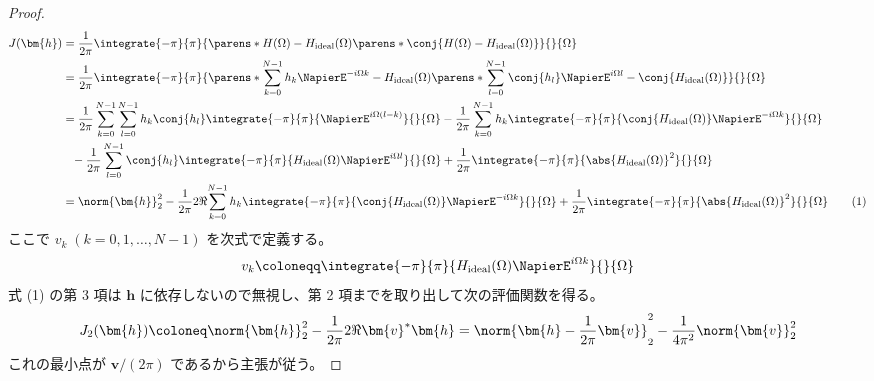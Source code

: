         \begin{proof}
            \begin{align*}
                J(\bm{h}) &= \frac{1}{2\pi}\integrate{-\pi}{\pi}{\parens*{H(\Omega)-\Hideal(\Omega)}\parens*{\conj{H(\Omega)-\Hideal(\Omega)}}}{}{\Omega} \\
                &= \frac{1}{2\pi}\integrate{-\pi}{\pi}{\parens*{\sum_{k=0}^{N-1} h_k\NapierE^{-i\Omega k} -\Hideal(\Omega)}\parens*{\sum_{l=0}^{N-1} \conj{h_l}\NapierE^{i\Omega l} -\conj{\Hideal(\Omega)}}}{}{\Omega} \\
                &= \frac{1}{2\pi}\sum_{k=0}^{N-1}\sum_{l=0}^{N-1} h_k\conj{h_l}\integrate{-\pi}{\pi}{\NapierE^{i\Omega(l-k)}}{}{\Omega} - \frac{1}{2\pi}\sum_{k=0}^{N-1} h_k\integrate{-\pi}{\pi}{\conj{\Hideal(\Omega)}\NapierE^{-i\Omega k}}{}{\Omega} \\
                &\phantom{=}- \frac{1}{2\pi}\sum_{l=0}^{N-1} \conj{h_l}\integrate{-\pi}{\pi}{\Hideal(\Omega)\NapierE^{i\Omega l}}{}{\Omega} + \frac{1}{2\pi}\integrate{-\pi}{\pi}{\abs{\Hideal(\Omega)}^2}{}{\Omega} \\
                &= \norm{\bm{h}}_2^2 - \frac{1}{2\pi}2\Re{\sum_{k=0}^{N-1} h_k\integrate{-\pi}{\pi}{\conj{\Hideal(\Omega)}\NapierE^{-i\Omega k}}{}{\Omega}} + \frac{1}{2\pi}\integrate{-\pi}{\pi}{\abs{\Hideal(\Omega)}^2}{}{\Omega} \tag{1}
            \end{align*}
            ここで $v_k\;(k=0,1,\dots,N-1)$ を次式で定義する。
            \[ v_k \coloneqq \integrate{-\pi}{\pi}{\Hideal(\Omega)\NapierE^{i\Omega k}}{}{\Omega} \]
            式 (1) の第 3 項は $\bm{h}$ に依存しないので無視し、第 2 項までを取り出して次の評価関数を得る。
            \[ J_2(\bm{h}) \coloneq \norm{\bm{h}}_2^2 - \frac{1}{2\pi}2\Re{\bm{v}^*\bm{h}} = \norm{\bm{h} - \frac{1}{2\pi}\bm{v}}_2^2 - \frac{1}{4\pi^2}\norm{\bm{v}}_2^2 \]
            これの最小点が $\bm{v}/(2\pi)$ であるから主張が従う。
        \end{proof}
